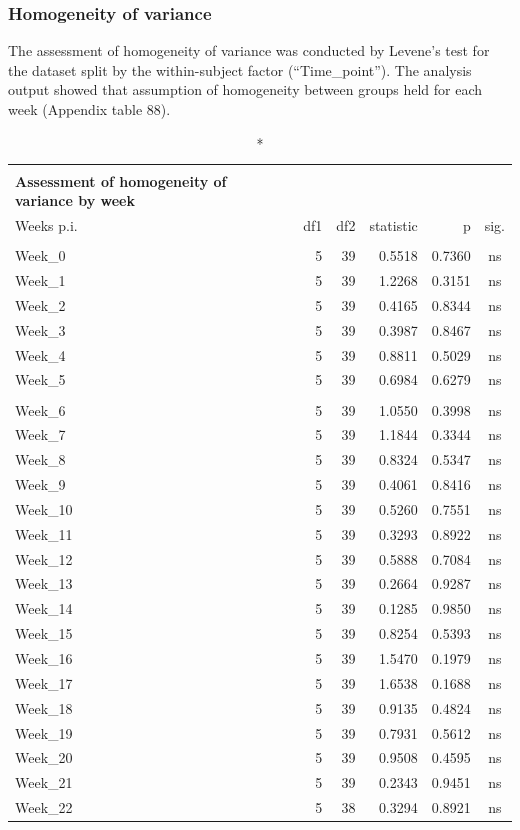 \documentclass[
  12pt,
  letterpaper,
]{article}
\begin{document}
\subsubsection{Homogeneity of variance}\label{homogeneity-of-variance-2}

The assessment of homogeneity of variance was conducted by Levene's test for the dataset split by the within-subject factor (``Time\_point''). The analysis output showed that assumption of homogeneity between groups held for each week (Appendix table 88).

\begingroup
\fontsize{12.0pt}{14.4pt}\selectfont
\begin{longtable}{l|rrrrc}
\caption*{
{\large \textbf{Appendix Table 88}} \\ 
{\small \textbf{Assessment of homogeneity of variance by week}}
} \\ 
\toprule
Weeks p.i. & {df1} & {df2} & {statistic} & {p} & {sig.} \\ 
\midrule\addlinespace[2.5pt]
\multicolumn{6}{l}{Pre-Infection} \\[2.5pt] 
\midrule\addlinespace[2.5pt]
Week\_0 & 5 & 39 & 0.5518 & 0.7360 & ns \\ 
Week\_1 & 5 & 39 & 1.2268 & 0.3151 & ns \\ 
Week\_2 & 5 & 39 & 0.4165 & 0.8344 & ns \\ 
Week\_3 & 5 & 39 & 0.3987 & 0.8467 & ns \\ 
Week\_4 & 5 & 39 & 0.8811 & 0.5029 & ns \\ 
Week\_5 & 5 & 39 & 0.6984 & 0.6279 & ns \\ 
\midrule\addlinespace[2.5pt]
\multicolumn{6}{l}{Post-Infestion} \\[2.5pt] 
\midrule\addlinespace[2.5pt]
Week\_6 & 5 & 39 & 1.0550 & 0.3998 & ns \\ 
Week\_7 & 5 & 39 & 1.1844 & 0.3344 & ns \\ 
Week\_8 & 5 & 39 & 0.8324 & 0.5347 & ns \\ 
Week\_9 & 5 & 39 & 0.4061 & 0.8416 & ns \\ 
Week\_10 & 5 & 39 & 0.5260 & 0.7551 & ns \\ 
Week\_11 & 5 & 39 & 0.3293 & 0.8922 & ns \\ 
Week\_12 & 5 & 39 & 0.5888 & 0.7084 & ns \\ 
Week\_13 & 5 & 39 & 0.2664 & 0.9287 & ns \\ 
Week\_14 & 5 & 39 & 0.1285 & 0.9850 & ns \\ 
Week\_15 & 5 & 39 & 0.8254 & 0.5393 & ns \\ 
Week\_16 & 5 & 39 & 1.5470 & 0.1979 & ns \\ 
Week\_17 & 5 & 39 & 1.6538 & 0.1688 & ns \\ 
Week\_18 & 5 & 39 & 0.9135 & 0.4824 & ns \\ 
Week\_19 & 5 & 39 & 0.7931 & 0.5612 & ns \\ 
Week\_20 & 5 & 39 & 0.9508 & 0.4595 & ns \\ 
Week\_21 & 5 & 39 & 0.2343 & 0.9451 & ns \\ 
Week\_22 & 5 & 38 & 0.3294 & 0.8921 & ns \\ 
\bottomrule
\end{longtable}
\endgroup
\end{document}
